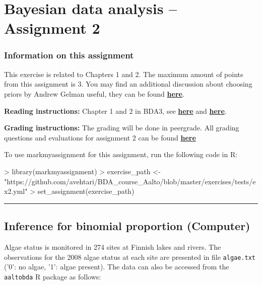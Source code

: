 \documentclass[a4paper,11pt]{article}
\newcommand{\HRule}{\rule{\linewidth}{0.5mm}}
\begin{document}

\thispagestyle{empty}

\section*{Bayesian data analysis -- Assignment 2}




\subsubsection*{Information on this assignment}

This exercise is related to Chapters 1 and 2. The maximum amount of points from this assignment is 3. You may find an additional discussion about choosing priors by Andrew Gelman useful, they can be found \href{http://andrewgelman.com/2017/10/04/worry-rigged-priors/}{\textbf{here}}.

\textbf{Reading instructions:} Chapter 1 and 2 in BDA3, see \href{https://github.com/avehtari/BDA_course_Aalto/blob/master/chapter_notes/BDA_notes_ch1.pdf}{\textbf{here}} and \href{https://github.com/avehtari/BDA_course_Aalto/blob/master/chapter_notes/BDA_notes_ch2.pdf}{\textbf{here}}.

\textbf{Grading instructions:} The grading will be done in peergrade. All grading questions and evaluations for assignment 2 can be found \href{https://github.com/avehtari/BDA_course_Aalto/blob/master/exercises/ex2_rubric.md}{\textbf{here}}

To use markmyassignment for this assignment, run the following code in R:



\begin{Schunk}
\begin{Sinput}
> library(markmyassignment)
> exercise_path <- 
    "https://github.com/avehtari/BDA_course_Aalto/blob/master/exercises/tests/ex2.yml"
> set_assignment(exercise_path)
\end{Sinput}
\end{Schunk}


\HRule

\newpage

\subsection*{Inference for binomial proportion (Computer)}

Algae status is monitored in 274 sites at Finnish lakes and rivers.
The observations for the 2008 algae status at each site are presented
in file {\tt algae.txt} ('0': no algae, '1': algae present). The data
can also be accessed from the {\tt aaltobda} R package as follows:
\end{document}
